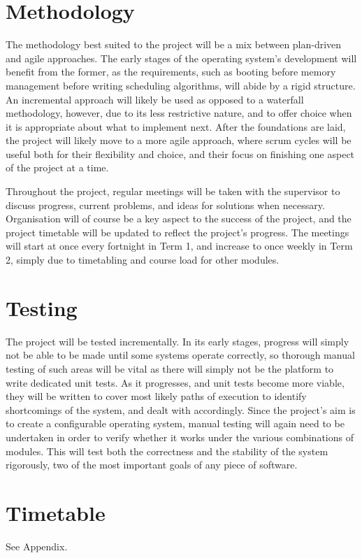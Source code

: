 \documentclass[10pt,a4paper]{article}
\begin{document}
\section*{Methodology}
The methodology best suited to the project will be a mix between plan-driven and
agile approaches. The early stages of the operating system's development will
benefit from the former, as the requirements, such as booting before memory
management before writing scheduling algorithms, will abide by a rigid
structure. An incremental approach will likely be used as opposed to a waterfall
methodology, however, due to its less restrictive nature, and to offer choice
when it is appropriate about what to implement next. After the foundations are
laid, the project will likely move to a more agile approach, where scrum cycles
will be useful both for their flexibility and choice, and their focus on
finishing one aspect of the project at a time.

Throughout the project, regular meetings will be taken with the supervisor to
discuss progress, current problems, and ideas for solutions when necessary.
Organisation will of course be a key aspect to the success of the project, and
the project timetable will be updated to reflect the project's progress. The
meetings will start at once every fortnight in Term 1, and increase to once
weekly in Term 2, simply due to timetabling and course load for other modules.

\section*{Testing}
The project will be tested incrementally. In its early stages, progress will
simply not be able to be made until some systems operate correctly, so thorough
manual testing of such areas will be vital as there will simply not be the
platform to write dedicated unit tests. As it progresses, and unit tests become
more viable, they will be written to cover most likely paths of execution to
identify shortcomings of the system, and dealt with accordingly. Since the
project's aim is to create a configurable operating system, manual testing will
again need to be undertaken in order to verify whether it works under the
various combinations of modules. This will test both the correctness and the
stability of the system rigorously, two of the most important goals of any piece
of software.

\section*{Timetable}
See Appendix.
\end{document}
